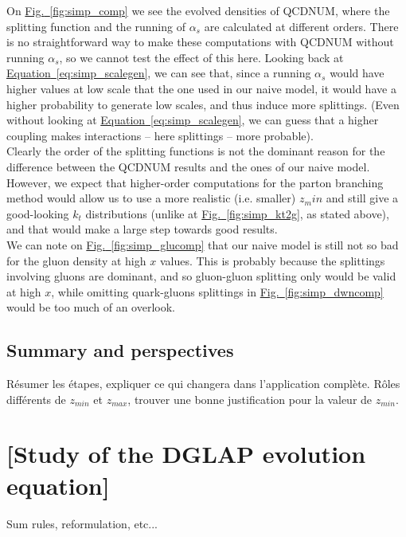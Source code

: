\documentclass[a4paper,10pt]{report}
\newcommand{\figlabel}{{Fig.}}
\newcommand{\eqlabel}{{Equation}}
\newcommand{\figref}[1]{\hyperref[#1]{\figlabel~\ref*{#1}}}
\newcommand{\equref}[1]{\hyperref[#1]{\eqlabel~\ref*{#1}}}
\begin{document}
    On \figref{fig:simp_comp} we see the evolved densities of QCDNUM, where the splitting function and the 
    running of $\alpha_s$ are calculated at different orders. There is no straightforward way to make these computations 
    with QCDNUM without running $\alpha_s$, so we cannot test the effect of this here. Looking back at \equref{eq:simp_scalegen}, we 
    can see that, since a running $\alpha_s$ would have higher values at low scale that the one used in our naive model, it would 
    have a higher probability to generate low scales, and thus induce more splittings. (Even without looking at \equref{eq:simp_scalegen}, 
    we can guess that a higher coupling makes interactions -- here splittings -- more probable).\\
    Clearly the order of the splitting functions is not the dominant reason for the difference between the QCDNUM results and the ones of our naive model. 
    However, we expect that higher-order computations for the parton branching method would allow us to use 
    a more realistic (i.e. smaller) $z_min$ and still give a good-looking $k_t$ distributions (unlike at \figref{fig:simp_kt2g}, as stated 
    above), and that would make a large step towards good results.\\
    
    We can note on \figref{fig:simp_glucomp} that our naive model is still not so bad for the gluon density at high $x$ values. 
    This is probably because the splittings involving gluons are dominant, and so gluon-gluon splitting only 
    would be valid at high $x$, while omitting quark-gluons splittings in \figref{fig:simp_dwncomp} would be 
    too much of an overlook.


    \section{Summary and perspectives}

    Résumer les étapes, expliquer ce qui changera dans l'application complète.
    Rôles différents de $z_{min}$ et $z_{max}$, trouver une 
    bonne justification pour la valeur de $z_{min}$.



\newpage

\chapter{[Study of the DGLAP evolution equation]}

Sum rules, reformulation, etc...
\end{document}
